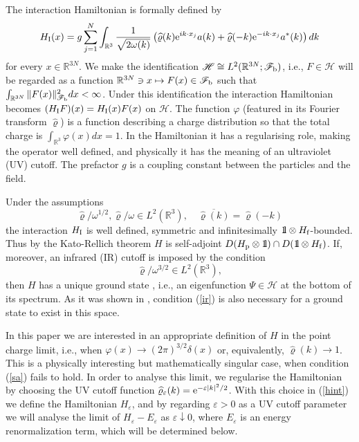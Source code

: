 \documentclass[12pt]{article}
\def\bbbone{{\mathchoice {\rm 1\mskip-4mu l} {\rm 1\mskip-4mu l}
{\rm 1\mskip-4.5mu l} {\rm 1\mskip-5mu l}}}
\def\one{\bbbone}
\providecommand{\eq}[1]{\begin{equation}\label{#1}}
\providecommand{\en}{\end{equation}}
\providecommand{\BR}{{\mathbb{R}^3 }}
\providecommand{\RR}{\mathbb{R}}
\providecommand{\LR}{{L^2(\BR)}}
\providecommand{\hn}{H}%
\providecommand{\ms}[1]{\mathscr{#1}}
\providecommand{\ffff}{{\mathscr{F}_{\rm b}}}
\providecommand{\add}{a^\ast}
\providecommand{\ov}[1]{\overline{#1}}
\providecommand{\hf}{H_{\rm f}}
\providecommand{\han}{{1/2}}
\providecommand{\hi}{H_{\rm I}}
\providecommand{\hp}{H_{\rm p}}
\providecommand{\hhh}{\ms H} %
\providecommand{\vp}{{\widehat \varrho}}
\providecommand{\vpe}{{\widehat \varrho_\eps}}
\providecommand{\vp}{\mathop{\mathrm{{\varphi}}}\nolimits}
\providecommand{\e}{{\rm e}}
\providecommand{\1}{\mathbb{1}}
\providecommand{\eps}{\varepsilon}
\newcounter {constant}
\begin{document}
The interaction Hamiltonian is formally  defined by
\begin{equation}
\label{hint}
\hi(x)  = g\sum_{j=1}^N \int_\BR \frac{1}{\sqrt{2\omega(k)}}
\left( \vp (k)\e^{ik\cdot x_j}  a(k) + \vp (-k)\e^{-ik\cdot x_j} \add(k)\right)  dk
\end{equation}
for every $x\in\RR^{3N}$. We make the identification $\hhh\cong L^2(\RR^{3N};\ffff )$, i.e., $F\in \hhh$
will be regarded as a function  $\RR^{3N}\ni x\mapsto F(x)\in \ffff $ such that $\int_{\RR^{3N}}\|F(x)\|^2_
\ffff  dx<\infty$. Under this identification the interaction Hamiltonian becomes $(\hi F)(x)=\hi(x) F(x)$ on
$\hhh$. The function $\varphi$ (featured in its Fourier transform $\vp$) is a function describing a charge
distribution so that the total charge is $\int_\BR \varphi(x) dx = 1$. In the Hamiltonian it has a
regularising role, making the operator well defined, and physically it has the meaning of an ultraviolet
(UV) cutoff. The prefactor $g$ is a coupling constant between the particles and the field.

Under the assumptions
\begin{equation}
{\vp }/{\omega^{1/2}}, {\vp }/{\omega}  \in   \LR ,\quad \ov{\vp(k)}=\vp(-k)
\label{sa}
\end{equation}
the interaction $\hi$ is well defined, symmetric and infinitesimally $\one\otimes \hf $-bounded. Thus
by the Kato-Rellich theorem $\hn$ is
 self-adjoint   $D(\hp\otimes \one) \cap
D(\one \otimes \hf )$. If, moreover, an infrared (IR) cutoff is imposed by the condition
\begin{equation}
{\vp }/{\omega^{3/2}}  \in  \LR,
\label{ir}
\end{equation}
then $\hn$ has a unique ground state \cite{spo98,bfs98,ger00,ara01,sas05}, i.e., an eigenfunction $\Psi
\in \hhh$ at the bottom of its spectrum. As it was shown in \cite{lms02,hir06}, condition (\ref{ir})
is also necessary for a ground state to exist in this space.

In this paper we are interested in an appropriate definition of $\hn$ in the point charge limit, i.e., when
$\varphi(x) \to (2\pi)^{3/2}\delta(x)$ or, equivalently, $\vp (k) \to 1 $. This is a physically interesting
but mathematically singular case, when condition (\ref{sa}) fails to hold. In order to analyse this limit,
we regularise the Hamiltonian by choosing the UV cutoff function $\vpe(k)=\e^{-\eps|k|^2/2}$. With this
choice in (\ref{hint}) we define the Hamiltonian $\hn_\eps$, and by regarding $\eps>0$ as a UV cutoff parameter
we will analyse the limit of $\hn_\eps-E_\eps$ as $\eps\downarrow 0$, where $E_\eps$ is an energy renormalization
term, which will be determined below.
\end{document}
